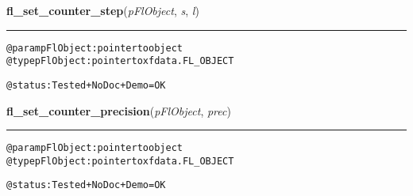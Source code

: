     \label{xformslib:flcounter:fl_set_counter_step}

    \vspace{0.5ex}

\hspace{.8\funcindent}\begin{boxedminipage}{\funcwidth}

    \raggedright \textbf{fl\_set\_counter\_step}(\textit{pFlObject}, \textit{s}, \textit{l})

    \vspace{-1.5ex}

    \rule{\textwidth}{0.5\fboxrule}
\setlength{\parskip}{2ex}
\begin{alltt}
        @param pFlObject: pointer to object
@type pFlObject: pointer to xfdata.FL\_OBJECT

        @status: Tested + NoDoc + Demo = OK
    
\end{alltt}

\setlength{\parskip}{1ex}
    \end{boxedminipage}

    \label{xformslib:flcounter:fl_set_counter_precision}

    \vspace{0.5ex}

\hspace{.8\funcindent}\begin{boxedminipage}{\funcwidth}

    \raggedright \textbf{fl\_set\_counter\_precision}(\textit{pFlObject}, \textit{prec})

    \vspace{-1.5ex}

    \rule{\textwidth}{0.5\fboxrule}
\setlength{\parskip}{2ex}
\begin{alltt}
        @param pFlObject: pointer to object
@type pFlObject: pointer to xfdata.FL\_OBJECT

        @status: Tested + NoDoc + Demo = OK
    
\end{alltt}

\setlength{\parskip}{1ex}
    \end{boxedminipage}

